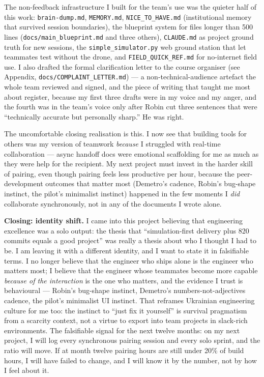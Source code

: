 The non-feedback infrastructure I built for the team's use was the quieter half of this work: \texttt{brain-dump.md}, \texttt{MEMORY.md}, \texttt{NICE\_TO\_HAVE.md} (institutional memory that survived session boundaries), the blueprint system for files longer than 500 lines (\texttt{docs/main\_blueprint.md} and three others), \texttt{CLAUDE.md} as project ground truth for new sessions, the \texttt{simple\_simulator.py} web ground station that let teammates test without the drone, and \texttt{FIELD\_QUICK\_REF.md} for no-internet field use. I also drafted the formal clarification letter to the course organiser (see Appendix, \texttt{docs/COMPLAINT\_LETTER.md}) --- a non-technical-audience artefact the whole team reviewed and signed, and the piece of writing that taught me most about register, because my first three drafts were in my voice and my anger, and the fourth was in the team's voice only after Robin cut three sentences that were ``technically accurate but personally sharp.'' He was right.

The uncomfortable closing realisation is this. I now see that building tools for others was my version of teamwork \emph{because} I struggled with real-time collaboration --- async handoff docs were emotional scaffolding for me as much as they were help for the recipient. My next project must invest in the harder skill of pairing, even though pairing feels less productive per hour, because the peer-development outcomes that matter most (Demetro's cadence, Robin's bug-shape instinct, the pilot's minimalist instinct) happened in the few moments I \emph{did} collaborate synchronously, not in any of the documents I wrote alone.

\textbf{Closing: identity shift.} I came into this project believing that engineering excellence was a solo output: the thesis that ``simulation-first delivery plus 820 commits equals a good project'' was really a thesis about who I thought I had to be. I am leaving it with a different identity, and I want to state it in falsifiable terms. I no longer believe that the engineer who ships alone is the engineer who matters most; I believe that the engineer whose teammates become more capable \emph{because of the interaction} is the one who matters, and the evidence I trust is behavioural --- Robin's bug-shape instinct, Demetro's numbers-not-adjectives cadence, the pilot's minimalist UI instinct. That reframes Ukrainian engineering culture for me too: the instinct to ``just fix it yourself'' is survival pragmatism from a scarcity context, not a virtue to export into team projects in slack-rich environments. The falsifiable signal for the next twelve months: on my next project, I will log every synchronous pairing session and every solo sprint, and the ratio will move. If at month twelve pairing hours are still under 20\% of build hours, I will have failed to change, and I will know it by the number, not by how I feel about it.
